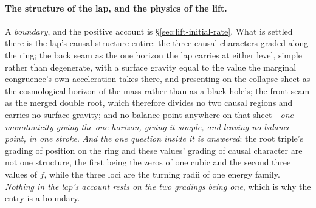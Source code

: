 \documentclass[11pt,a4paper]{article}
\theoremstyle{plain}
\theoremstyle{definition}
\theoremstyle{remark}
\begin{document}
\paragraph{The structure of the lap, and the physics of the lift.} A \emph{boundary}, and the positive account is \S\ref{sec:lift-initial-rate}. What is settled there is the lap's causal structure entire: the three causal characters graded along the ring; the back seam as the one horizon the lap carries at either level, simple rather than degenerate, with a surface gravity equal to the value the marginal congruence's own acceleration takes there, and presenting on the collapse sheet as the cosmological horizon of the mass rather than as a black hole's; the front seam as the merged double root, which therefore divides no two causal regions and carries no surface gravity; and no balance point anywhere on that sheet---\emph{one monotonicity giving the one horizon, giving it simple, and leaving no balance point, in one stroke}. \emph{And the one question inside it is answered}: the root triple's grading of position on the ring and these values' grading of causal character are not one structure, the first being the zeros of one cubic and the second three values of $f$, while the three loci are the turning radii of one energy family. \emph{Nothing in the lap's account rests on the two gradings being one}, which is why the entry is a boundary.
\end{document}
